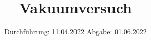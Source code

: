 

\subject{Versuch Nr.V70}
\title{Vakuumversuch}
\date{%
  Durchführung: 11.04.2022
  \hspace{3em}
  Abgabe: 01.06.2022
}



\maketitle
\thispagestyle{empty}
\tableofcontents
\newpage 








\nocite{*}

\printbibliography{}


